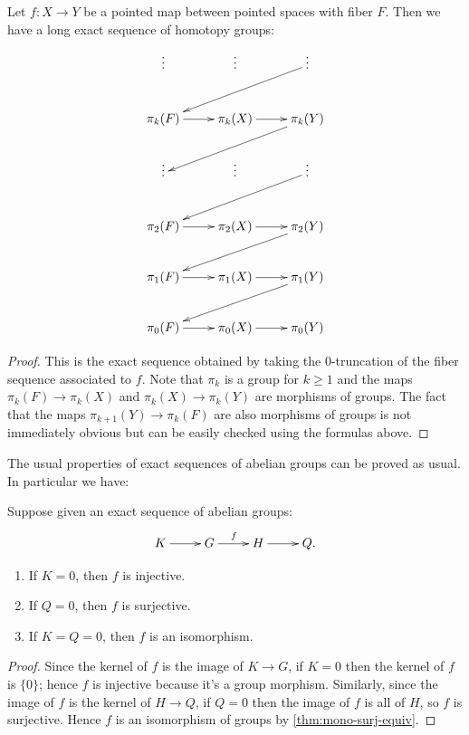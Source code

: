 \begin{thm}\label{thm:les}
  Let $f:X \to Y$ be a pointed map between pointed spaces with fiber $F$. Then
  we have a long exact sequence of homotopy groups:
  \[
  \xymatrix{
    \vdots & \vdots & \vdots \ar[lld] \\
    \pi_k(F) \ar[r] & \pi_k(X) \ar[r] & \pi_k(Y) \ar[lld] \\
    \vdots & \vdots & \vdots \ar[lld] \\
    \pi_2(F) \ar[r] & \pi_2(X) \ar[r] & \pi_2(Y) \ar[lld] \\
    \pi_1(F) \ar[r] & \pi_1(X) \ar[r] & \pi_1(Y) \ar[lld]\\
    \pi_0(F) \ar[r] & \pi_0(X) \ar[r] & \pi_0(Y)}
  \]
\end{thm}
\begin{proof}
  This is the exact sequence obtained by taking the $0$-truncation of the fiber
  sequence associated to $f$. Note that $\pi_k$ is a group for $k\ge1$ and the
  maps $\pi_k(F)\to\pi_k(X)$ and $\pi_k(X)\to\pi_k(Y)$ are morphisms of groups.
  The fact that the maps $\pi_{k+1}(Y)\to\pi_k(F)$ are also morphisms of groups
  is not immediately obvious but can be easily checked using the formulas above.
\end{proof}

The usual properties of exact sequences of abelian groups can be proved as
usual. In particular we have:
\begin{lem}\label{thm:ses}
  Suppose given an exact sequence of abelian groups:
  \[\xymatrix{K \ar[r]& G \ar^f[r] & H \ar[r] & Q.}\]
  \begin{enumerate}
  \item If $K=0$, then $f$ is injective.\label{item:sesinj}
  \item If $Q=0$, then $f$ is surjective.\label{item:sessurj}
  \item If $K=Q=0$, then $f$ is an isomorphism.\label{item:sesiso}
  \end{enumerate}
\end{lem}
\begin{proof}
  Since the kernel of $f$ is the image of $K\to G$, if $K=0$ then the kernel of $f$ is $\{0\}$;
  hence $f$ is injective because it's a group morphism.
  Similarly, since the image of $f$ is the kernel of $H\to Q$, if $Q=0$ then the image of $f$ is all of $H$, so $f$ is surjective.
  Hence $f$ is an isomorphism of groups by \autoref{thm:mono-surj-equiv}.
\end{proof}

